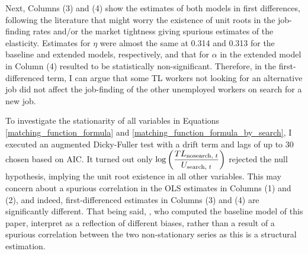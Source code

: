 \documentclass[a4paper, 11pt, tikz]{article}
\begin{document}


Next, Columns (3) and (4) show the estimates of both models in first differences, following the literature that might worry the existence of unit roots in the job-finding rates and/or the market tightness giving spurious estimates of the elasticity.
Estimates for $\eta$ were almost the same at 0.314 and 0.313 for the baseline and extended models, respectively, and that for $\alpha$ in the extended model in Column (4) resulted to be statistically non-significant.
Therefore, in the first-differenced term, I can argue that some TL workers not looking for an alternative job did not affect the job-finding of the other unemployed workers on search for a new job.

To investigate the stationarity of all variables in Equations \ref{matching_function_formula} and \ref{matching_function_formula_by_search}, I executed an augmented Dicky-Fuller test with a drift term and lags of up to 30 chosen based on AIC.
It turned out only $\log\qty(\dfrac{TL_{\text{nosearch, }t}}{U_{\text{search, }t}})$ rejected the null hypothesis, implying the unit root existence in all other variables.
This may concern about a spurious correlation in the OLS estimates in Columns (1) and (2), and indeed, first-differenced estimates in Columns (3) and (4) are significantly different.
That being said, \cite{borowczyk-martins2013accounting}, who computed the baseline model of this paper, interpret as a reflection of different biases, rather than a result of a spurious correlation between the two non-stationary series as this is a structural estimation.
\end{document}
